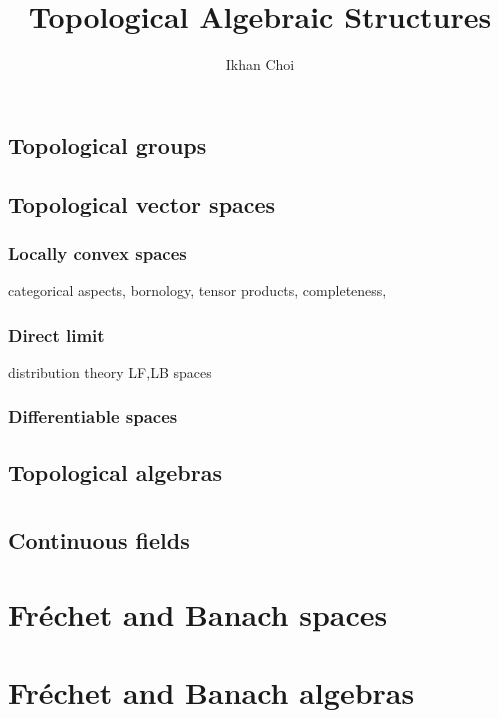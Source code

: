 \documentclass{../../large}
\begin{document}
\title{Topological Algebraic Structures}
\author{Ikhan Choi}
\maketitle
\tableofcontents

\part{}



\chapter{Topological groups}

\chapter{Topological vector spaces}
\section{Locally convex spaces}
categorical aspects,
bornology,
tensor products,
completeness,
\section{Direct limit}
distribution theory
LF,LB spaces
\section{Differentiable spaces}


\chapter{Topological algebras}

\part{}
\chapter{Continuous fields}


\part{Fr\'echet and Banach spaces}


\part{Fr\'echet and Banach algebras}
\end{document}
